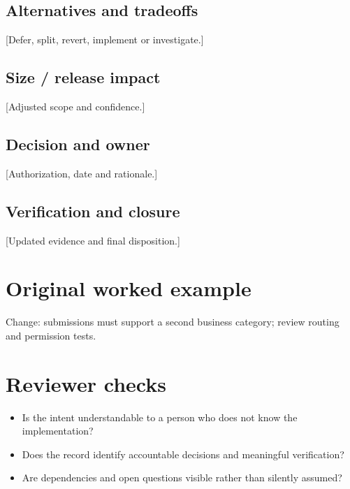 \documentclass[11pt,letterpaper]{article}
\begin{document}
\subsection{Alternatives and tradeoffs}
[Defer, split, revert, implement or investigate.]

\subsection{Size / release impact}
[Adjusted scope and confidence.]

\subsection{Decision and owner}
[Authorization, date and rationale.]

\subsection{Verification and closure}
[Updated evidence and final disposition.]

\section{Original worked example}
\begin{tcolorbox}[colback=tealback,colframe=navy,title={Illustrative entry},breakable]
Change: submissions must support a second business category; review routing and permission tests.

\end{tcolorbox}
\section{Reviewer checks}
\begin{itemize}[leftmargin=*,itemsep=2pt]
\item Is the intent understandable to a person who does not know the implementation?
\item Does the record identify accountable decisions and meaningful verification?
\item Are dependencies and open questions visible rather than silently assumed?
\end{itemize}
\end{document}

